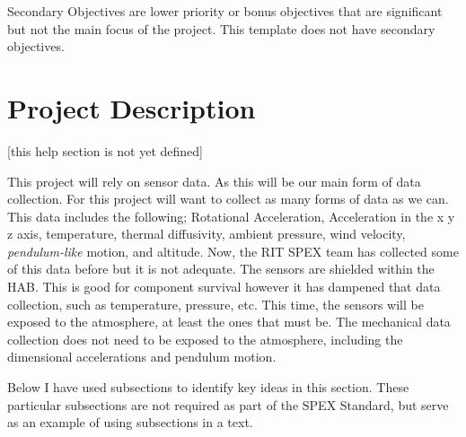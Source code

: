 \documentclass[journal]{SPEXformat}
\newenvironment{help}{
  \ttfamily\footnotesize\sloppy
  \begin{lrbox}{\helpbox}\begin{minipage}{\linewidth}
  }{
  \end{minipage}\end{lrbox}
  \ifbool{showhelp}{
    \fbox{\usebox{\helpbox}}
  }{}
}
\begin{document}

\begin{help}
  Secondary Objectives are lower priority or bonus objectives that are significant but not the main focus of the project. This template does not have secondary objectives.
\end{help}

\section{Project Description}
\label{sec:benefit}
\begin{help}
  [this help section is not yet defined]
\end{help}
  This project will rely on sensor data. As this will be our main form of data collection. For this project will want to
  collect as many forms of data as we can. This data includes the following; Rotational Acceleration, Acceleration in the
  x y z axis, temperature, thermal diffusivity, ambient pressure, wind velocity, \textit{pendulum-like} motion, and altitude.
  Now, the RIT SPEX team has collected some of this data before but it is not adequate. The sensors are shielded within the HAB.
  This is good for component survival however it has dampened that data collection, such as temperature, pressure, etc.
  This time, the sensors will be exposed to the atmosphere, at least the ones that must be. The mechanical data collection
  does not need to be exposed to the atmosphere, including the dimensional accelerations and pendulum motion.
\begin{help}
  Below I have used subsections to identify key ideas in this section. These particular subsections are not required as part of the SPEX Standard, but serve as an example of using subsections in a text.
\end{help}
\end{document}
